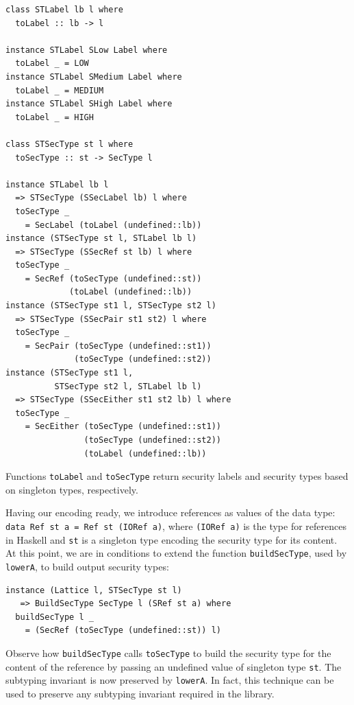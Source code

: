 \documentclass[times, 10pt,twocolumn]{article}
\begin{document}
\begin{Verbatim}[fontsize=\footnotesize]
class STLabel lb l where
  toLabel :: lb -> l

instance STLabel SLow Label where
  toLabel _ = LOW
instance STLabel SMedium Label where
  toLabel _ = MEDIUM
instance STLabel SHigh Label where
  toLabel _ = HIGH

class STSecType st l where
  toSecType :: st -> SecType l

instance STLabel lb l 
  => STSecType (SSecLabel lb) l where
  toSecType _ 
    = SecLabel (toLabel (undefined::lb))
instance (STSecType st l, STLabel lb l)
  => STSecType (SSecRef st lb) l where
  toSecType _  
    = SecRef (toSecType (undefined::st)) 
             (toLabel (undefined::lb))
instance (STSecType st1 l, STSecType st2 l)
  => STSecType (SSecPair st1 st2) l where
  toSecType _  
    = SecPair (toSecType (undefined::st1)) 
              (toSecType (undefined::st2))
instance (STSecType st1 l, 
          STSecType st2 l, STLabel lb l)
  => STSecType (SSecEither st1 st2 lb) l where
  toSecType _ 
    = SecEither (toSecType (undefined::st1)) 
                (toSecType (undefined::st2)) 
                (toLabel (undefined::lb))
\end{Verbatim}
Functions \texttt{toLabel} and \texttt{toSecType} return  
security labels and security types based on singleton types, respectively. 

Having our encoding ready, we introduce references as values of the 
data type: 
\texttt{data Ref st a = Ref st (IORef a)},
where \texttt{(IORef a)} is the type for references in Haskell and \texttt{st} is a
singleton type encoding the security type 
for its content. At this point, we are in conditions to extend the
function \texttt{buildSecType}, used by \texttt{lowerA},
to build output security types: 
\begin{Verbatim}[fontsize=\footnotesize]
instance (Lattice l, STSecType st l) 
   => BuildSecType SecType l (SRef st a) where
  buildSecType l _  
    = (SecRef (toSecType (undefined::st)) l)
\end{Verbatim}
Observe how \texttt{buildSecType} calls \texttt{toSecType} 
to build the security type for the content of the reference 
by passing an undefined value of singleton type \texttt{st}.
The subtyping invariant is now preserved by \texttt{lowerA}. 
In fact, this technique can be used to preserve any subtyping 
invariant required in the library.
\end{document}
